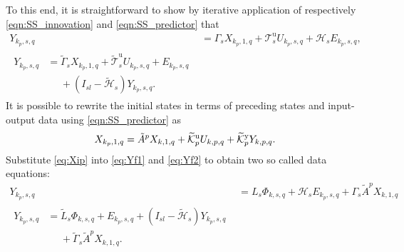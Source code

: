 To this end, it is straightforward to show by iterative application of respectively \eqref{eqn:SS_innovation} and \eqref{eqn:SS_predictor} that%
\begin{align}
    Y_{k_p,s,q} &= \Gamma_s X_{k_p,1,q} + \mathcal{T}_s^\mathrm{u} U_{k_p,s,q} + \mathcal{H}_s E_{k_p,s,q}\label{eq:Yf1},\\
    \begin{split}%
    Y_{k_p,s,q} &= \widetilde{\Gamma}_s X_{k_p,1,q} + \widetilde{\mathcal{T}}_s^\mathrm{u} U_{k_p,s,q} + E_{k_p,s,q}\\
    &\phantom{=}+(I_{sl}-\widetilde{\mathcal{H}}_s)Y_{k_p,s,q}.
    \end{split}\label{eq:Yf2}
\end{align}
It is possible to rewrite the initial states in terms of preceding states and input-output data using \eqref{eqn:SS_predictor} as%
\begin{align}\label{eq:Xip}
    X_{k_p,1,q} = \tilde{A}^p X_{k,1,q} + \widetilde{\mathcal{K}}_{p}^{\mathrm{{u}}} U_{k,p,q} + \widetilde{\mathcal{K}}_{p}^{\mathrm{{y}}} Y_{k,p,q}.
\end{align}
Substitute \eqref{eq:Xip} into \eqref{eq:Yf1} and \eqref{eq:Yf2} %
to obtain two so called data equations:
\begin{align}
    Y_{k_p,s,q} &= L_s \Phi_{k,s,q} + \mathcal{H}_s E_{k_p,s,q} + \Gamma_s \tilde{A}^p X_{k,1,q}\label{eq:DataEq1}\\
    \begin{split}
    Y_{k_p,s,q} &= \widetilde{L}_s \Phi_{k,s,q} + E_{k_p,s,q} + (I_{sl}-\widetilde{\mathcal{H}}_s) Y_{k_p,s,q} \\
    &\phantom{=}+ \widetilde{\Gamma}_s \tilde{A}^p X_{k,1,q}.
    \end{split}\label{eq:DataEq2}
\end{align}
%
